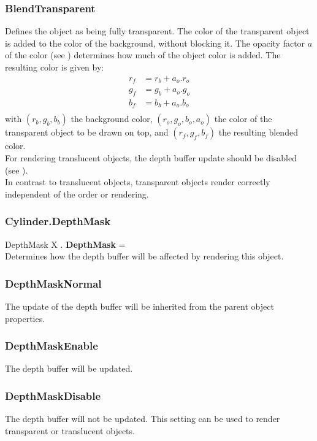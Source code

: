 \subsubsection{BlendTransparent \label{T:BlendType|BlendTransparent}}
Defines the object as being fully transparent. The color of the transparent object is added to the color of the background, without blocking it. The opacity factor $a$ of the color (see ) determines how much of the object color is added. The resulting color is given by:
\begin{equation}
\begin{array}{rcl}
r_f & = r_b + a_o . r_o \\
g_f & = g_b + a_o . g_o \\
b_f & = b_b + a_o . b_o \\
\end{array}
\end{equation}
with $(r_b,g_b,b_b)$ the background color, $(r_o,g_o,b_o,a_o)$ the color of the transparent object to be drawn on top, and $(r_f,g_f,b_f)$ the resulting blended color. \\
For rendering translucent objects, the depth buffer update should be disabled (see ). \\
In contrast to translucent objects, transparent objects render correctly independent of the order or rendering.

\subsubsection{Cylinder.DepthMask \label{F:Cylinder:DepthMask}}
DepthMask X . \textbf{DepthMask} = \\
Determines how the depth buffer will be affected by rendering this object.

\subsubsection{DepthMaskNormal \label{T:DepthMask|DepthMaskNormal}}
The update of the depth buffer will be inherited from the parent object properties.

\subsubsection{DepthMaskEnable \label{T:DepthMask|DepthMaskEnable}}
The depth buffer will be updated.

\subsubsection{DepthMaskDisable \label{T:DepthMask|DepthMaskDisable}}
The depth buffer will not be updated. This setting can be used to render transparent or translucent objects.


